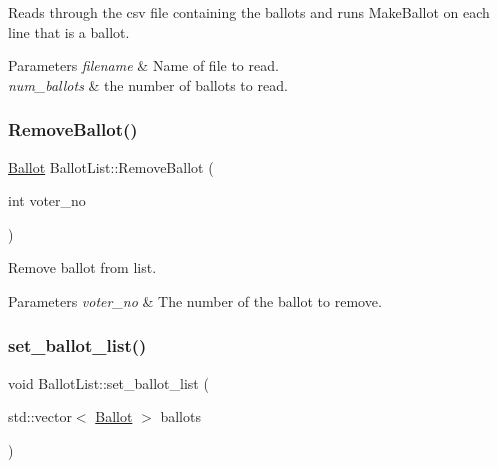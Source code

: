 Reads through the csv file containing the ballots and runs Make\+Ballot on each line that is a ballot. 


\begin{DoxyParams}{Parameters}
{\em filename} & Name of file to read. \\
\hline
{\em num\+\_\+ballots} & the number of ballots to read. \\
\hline
\end{DoxyParams}
\mbox{\label{class_ballot_list_a1d77010372fbcbf06a87028f6862f58c}} 
\subsubsection{\texorpdfstring{Remove\+Ballot()}{RemoveBallot()}}
{\footnotesize\ttfamily \mbox{\hyperlink{class_ballot}{Ballot}} Ballot\+List\+::\+Remove\+Ballot (\begin{DoxyParamCaption}\item[{int}]{voter\+\_\+no }\end{DoxyParamCaption})}



Remove ballot from list. 


\begin{DoxyParams}{Parameters}
{\em voter\+\_\+no} & The number of the ballot to remove. \\
\hline
\end{DoxyParams}
\mbox{\label{class_ballot_list_aff8ea545ef67d60287aa543af731b331}} 
\subsubsection{\texorpdfstring{set\+\_\+ballot\+\_\+list()}{set\_ballot\_list()}}
{\footnotesize\ttfamily void Ballot\+List\+::set\+\_\+ballot\+\_\+list (\begin{DoxyParamCaption}\item[{std\+::vector$<$ \mbox{\hyperlink{class_ballot}{Ballot}} $>$}]{ballots }\end{DoxyParamCaption})\hspace{0.3cm}{\ttfamily [inline]}}



